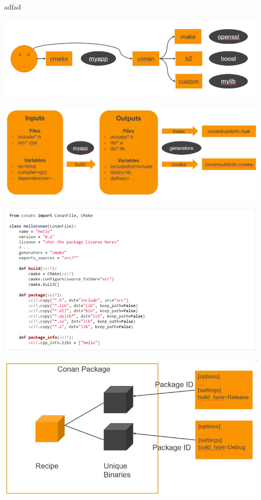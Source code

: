 \documentclass[10pt,a4paper]{article}
\author{namorDev}
\begin{document}
\raggedright
\raggedcolumns

\footnotesize %



adfad


\includegraphics[scale=0.2]{BuildSystemAbstraction}


\includegraphics[scale=0.2]{Recipe_InOut}


\includegraphics[scale=0.2]{Recipe}


\includegraphics[scale=0.2]{BinaryManagement}
\end{document}
